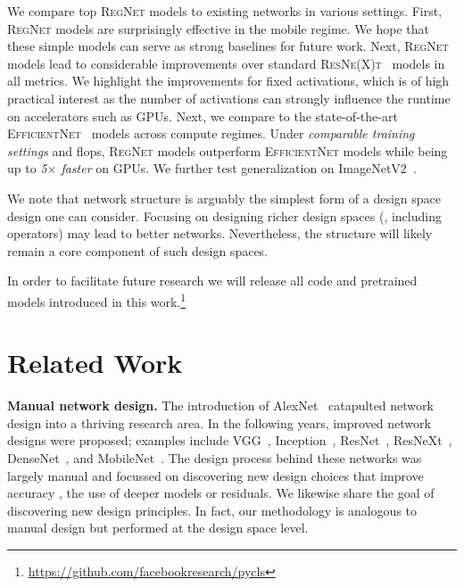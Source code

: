 \documentclass[10pt,twocolumn,letterpaper]{article}
\renewcommand{\paragraph}[1]{\vspace{1.5mm}\noindent\textbf{#1}}
\def\x{{\times}}
\newcommand{\model}[1]{\textsc{\small#1}}
\begin{document}
We compare top \model{RegNet} models to existing networks in various settings. First, \model{RegNet} models are surprisingly effective in the mobile regime. We hope that these simple models can serve as strong baselines for future work. Next, \model{RegNet} models lead to considerable improvements over standard \model{ResNe(X)t}~\cite{He2016, Xie2017} models in all metrics. We highlight the improvements for fixed activations, which is of high practical interest as the number of activations can strongly influence the runtime on accelerators such as GPUs. Next, we compare to the state-of-the-art \model{EfficientNet}~\cite{Tan2019} models across compute regimes. Under \emph{comparable training settings} and flops, \model{RegNet} models outperform \model{EfficientNet} models while being up to \emph{5$\x$ faster} on GPUs. We further test generalization on ImageNetV2~\cite{Recht2019}.

We note that network structure is arguably the simplest form of a design space design one can consider. Focusing on designing richer design spaces (\eg, including operators) may lead to better networks. Nevertheless, the structure will likely remain a core component of such design spaces.

In order to facilitate future research we will release all code and pretrained models introduced in this work.\footnote{\url{https://github.com/facebookresearch/pycls}}

\section{Related Work}

\paragraph{Manual network design.} The introduction of AlexNet~\cite{Krizhevsky2012} catapulted network design into a thriving research area. In the following years, improved network designs were proposed; examples include VGG~\cite{Simonyan2015}, Inception~\cite{Szegedy2015, Szegedy2016a}, ResNet~\cite{He2016}, ResNeXt~\cite{Xie2017}, DenseNet~\cite{Huang2017}, and MobileNet~\cite{Howard2017, Sandler2018}. The design process behind these networks was largely manual and focussed on discovering new design choices that improve accuracy \eg, the use of deeper models or residuals. We likewise share the goal of discovering new design principles. In fact, our methodology is analogous to manual design but performed at the design space level.
\end{document}
